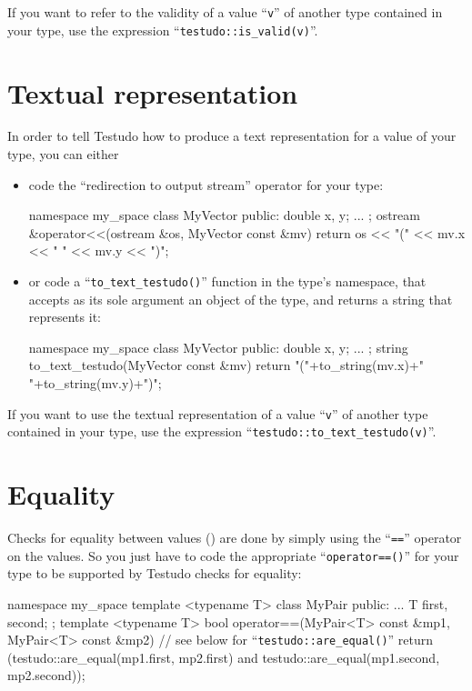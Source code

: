 \documentclass[twoside, a4paper, article]{memoir}
\begin{document}
If you want to refer to the validity of a value ``\texttt{v}'' of another type
contained in your type, use the expression ``\texttt{testudo::is\_valid(v)}''.

\section{Textual representation}
\label{sec:textual-representation}

In order to tell Testudo how to produce a text representation for a value of
your type, you can either
\begin{itemize}
\item code the ``redirection to output stream'' operator for your type:
\begin{cpplisting}
namespace my_space {
  class MyVector {
  public:
    double x, y;
    ...
  };
  ostream &operator<<(ostream &os, MyVector const &mv) {
    return os << "(" << mv.x << " " << mv.y << ")";
  }
}
\end{cpplisting}
\item or code a ``\texttt{to\_text\_testudo()}'' function in the type's
  namespace, that accepts as its sole argument an object of the type, and
  returns a string that represents it:
\begin{cpplisting}
namespace my_space {
  class MyVector {
  public:
    double x, y;
    ...
  };
  string to_text_testudo(MyVector const &mv) {
    return "("+to_string(mv.x)+" "+to_string(mv.y)+")";
  }
}
\end{cpplisting}
\end{itemize}

If you want to use the textual representation of a value ``\texttt{v}'' of
another type contained in your type, use the expression
``\texttt{testudo::to\_text\_testudo(v)}''.

\section{Equality}
\label{sec:equality}

Checks for equality between values
() are done by simply using the
``\texttt{==}'' operator on the values.  So you just have to code the
appropriate ``\texttt{operator==()}'' for your type to be supported by Testudo
checks for equality:
\begin{cpplisting}
namespace my_space {
  template <typename T>
  class MyPair {
  public:
    ...
    T first, second;
  };
  template <typename T>
  bool operator==(MyPair<T> const &mp1,
                  MyPair<T> const &mp2) {
    // see below for ``\texttt{testudo::are\_equal()}''
    return (testudo::are_equal(mp1.first, mp2.first)
             and testudo::are_equal(mp1.second, mp2.second));
  }
}
\end{cpplisting}
\end{document}
